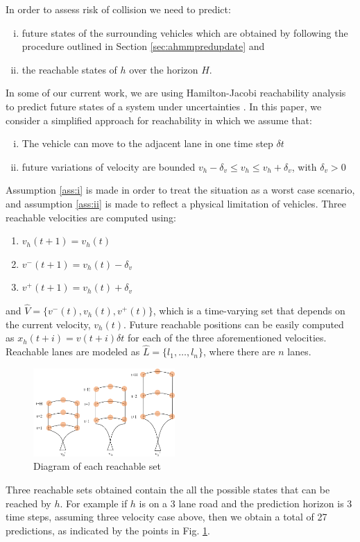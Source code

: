 \documentclass[letterpaper, 10 pt, conference]{ieeeconf}  %
\newcommand\NB[1]{$\spadesuit$\footnote{NB: #1}}
\newcommand\RP[1]{$\clubsuit$\footnote{RP: #1}}
\begin{document}
In order to assess risk of collision we need to predict:
\begin{enumerate}[i.]
\item future states of the surrounding vehicles which are obtained by following the procedure outlined in Section \ref{sec:ahmmpredupdate} and
\item the reachable states of $h$ over the horizon $H$.
\end{enumerate}
In some of our current work, we are using Hamilton-Jacobi reachability analysis to predict future states of a system under uncertainties \cite{esen}. In this paper, we consider a simplified approach for reachability in which we assume that:
\begin{enumerate}[i.]
\item The vehicle can move to the adjacent lane in one time step $\delta t$ \label{ass:i}
\item future variations of velocity are bounded $v_h-\delta_v \leq v_h\leq v_h+\delta_v$, with $\delta_v>0$ \label{ass:ii}
\end{enumerate}
Assumption \ref{ass:i} is made in order to treat the situation as a worst case scenario, and assumption \ref{ass:ii} is made to reflect a physical limitation of vehicles.
Three reachable velocities are computed using:
\begin{enumerate} %
    \item $v_h(t+1)=v_h(t)$
    \item $v^-(t+1)=v_h(t)-\delta_v$
    \item $v^+(t+1)=v_h(t)+\delta_v$
\end{enumerate} 
and $\hat{V} = \{v^-(t),v_h(t),v^+(t)\}$, which is a time-varying set that depends on the current velocity, $v_h(t)$. Future reachable positions can be easily computed as $x_h(t+i)=v(t+i)\delta t$ for each of the three aforementioned velocities. Reachable lanes are modeled as $\hat{L} = \{l_1,\ldots,l_n\}$, where there are $n$ lanes. 
\begin{figure}[ht!]
    \includegraphics[width=0.48\textwidth]{fig/input.png}
    \caption{Diagram of each reachable set}
    \label{fig:reach}
\end{figure}
Three reachable sets obtained contain the all the possible states that can be reached by $h$. For example if $h$ is on a 3 lane road and the prediction horizon is 3 time steps, assuming three velocity case above, then we obtain a total of 27 predictions, as indicated by the points in Fig. \ref{fig:reach}.
\end{document}
